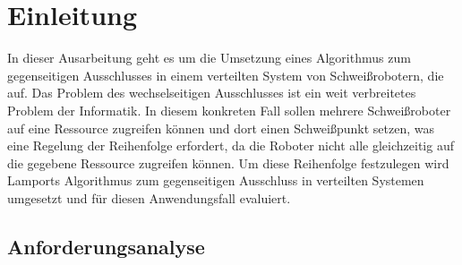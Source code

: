 %
\chapter{Einleitung}
In dieser Ausarbeitung geht es um die Umsetzung eines Algorithmus zum gegenseitigen Ausschlusses in einem
verteilten System von Schweißrobotern, die auf. Das Problem des wechselseitigen Ausschlusses 
ist ein weit verbreitetes Problem der Informatik. In diesem konkreten Fall sollen mehrere Schweißroboter
auf eine Ressource zugreifen können und dort einen Schweißpunkt setzen, was eine Regelung der Reihenfolge
erfordert, da die Roboter nicht alle gleichzeitig auf die gegebene Ressource zugreifen können. Um diese Reihenfolge
festzulegen wird Lamports Algorithmus \citep{lamport} zum gegenseitigen Ausschluss in verteilten Systemen umgesetzt
und für diesen Anwendungsfall evaluiert.

\section{Anforderungsanalyse}

